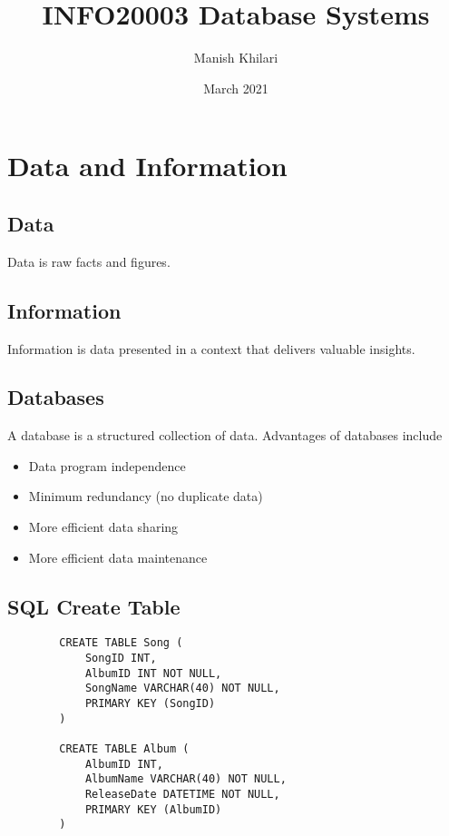 \documentclass[12pt, a4paper]{article}
\title{INFO20003 Database Systems}
\author{Manish Khilari}
\date{March 2021}
\begin{document}
    
    \maketitle

    \section{Data and Information}
    \subsection{Data}
    Data is raw facts and figures. 

    \subsection{Information}
    Information is data presented in a context that delivers valuable insights. 

    \subsection{Databases}
    A database is a structured collection of data.  
    Advantages of databases include 
    \begin{itemize}
        \item Data program independence 
        \item Minimum redundancy (no duplicate data) 
        \item More efficient data sharing 
        \item More efficient data maintenance 
    \end{itemize}

    \subsection{SQL Create Table}
    \begin{verbatim}
        CREATE TABLE Song (
            SongID INT, 
            AlbumID INT NOT NULL, 
            SongName VARCHAR(40) NOT NULL, 
            PRIMARY KEY (SongID)
        )

        CREATE TABLE Album (
            AlbumID INT, 
            AlbumName VARCHAR(40) NOT NULL, 
            ReleaseDate DATETIME NOT NULL, 
            PRIMARY KEY (AlbumID)
        )
    \end{verbatim}
\end{document}
